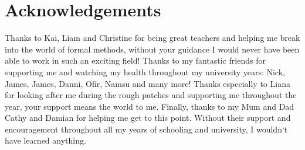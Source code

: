 \chapter*{Acknowledgements}\label{ack}

Thanks to Kai, Liam and Christine for being great teachers and helping me break into the world
of formal methods, without your guidance I would never have been able to work in such an
exciting field!
Thanks to my fantastic friends for supporting me and watching my health throughout my
university years: Nick, James, James, Danni, Ofir, Namsu and many more!
Thanks especially to Liana for looking after me during the rough patches and supporting me
throughout the year, your support means the world to me.
Finally, thanks to my Mum and Dad Cathy and Damian for helping me get to this point. Without their
support and encouragement throughout all my years of schooling and university,  I wouldn`t
have learned anything.